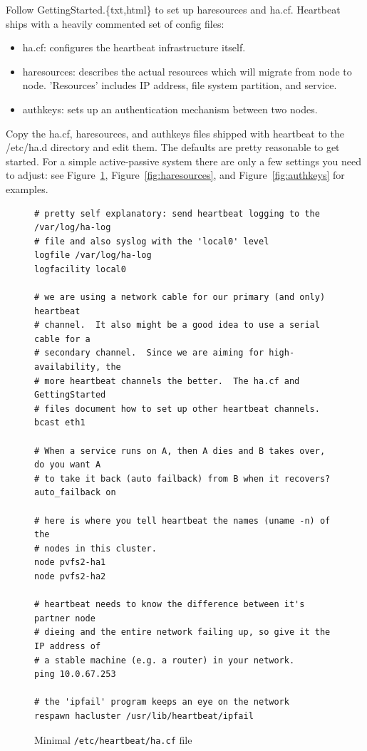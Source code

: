 \documentclass[11pt]{article}
\begin{document}
Follow GettingStarted.\{txt,html\} to set up haresources and ha.cf.
Heartbeat ships with a heavily commented set of config files:
\begin{itemize}
\item ha.cf: configures the heartbeat infrastructure itself.
\item haresources: describes the actual resources which will migrate
  from node to node.  'Resources' includes IP address, file system
  partition, and service. 
\item authkeys: sets up an authentication mechanism between two nodes.
\end{itemize}

Copy the ha.cf, haresources, and authkeys files shipped with heartbeat
to the /etc/ha.d directory and edit them. The defaults are pretty
reasonable to get started.  For a simple active-passive system
there are only a few settings you need to adjust: see
Figure~\ref{fig:haconfig}, Figure~\ref{fig:haresources}, and
Figure~\ref{fig:authkeys} for examples.

\begin{figure}
\begin{scriptsize}
\begin{verbatim}
# pretty self explanatory: send heartbeat logging to the /var/log/ha-log
# file and also syslog with the 'local0' level
logfile /var/log/ha-log
logfacility local0

# we are using a network cable for our primary (and only) heartbeat
# channel.  It also might be a good idea to use a serial cable for a
# secondary channel.  Since we are aiming for high-availability, the
# more heartbeat channels the better.  The ha.cf and GettingStarted
# files document how to set up other heartbeat channels.
bcast eth1

# When a service runs on A, then A dies and B takes over, do you want A
# to take it back (auto failback) from B when it recovers?  
auto_failback on

# here is where you tell heartbeat the names (uname -n) of the
# nodes in this cluster.
node pvfs2-ha1
node pvfs2-ha2

# heartbeat needs to know the difference between it's partner node
# dieing and the entire network failing up, so give it the IP address of
# a stable machine (e.g. a router) in your network.
ping 10.0.67.253

# the 'ipfail' program keeps an eye on the network
respawn hacluster /usr/lib/heartbeat/ipfail
\end{verbatim}
\end{scriptsize}
\caption{Minimal \texttt{/etc/heartbeat/ha.cf} file}
\label{fig:haconfig}
\end{figure}
\end{document}
